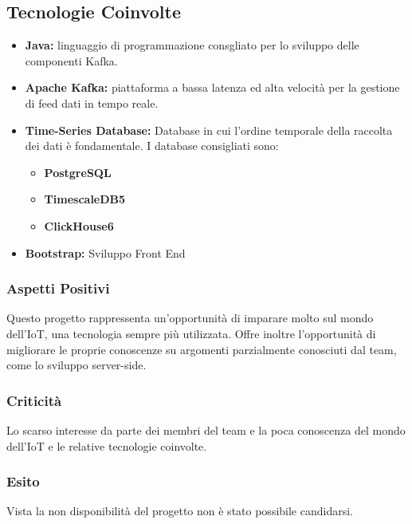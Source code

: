 	\subsection{Tecnologie Coinvolte}
	\begin{itemize}
		\item \textbf{Java:} linguaggio di programmazione consgliato per lo sviluppo delle componenti Kafka.
		\item \textbf{Apache Kafka:} piattaforma a bassa latenza ed alta velocità per la gestione di feed dati in tempo reale.
		\item \textbf{Time-Series Database:} Database in cui l'ordine temporale della raccolta dei dati è fondamentale. I database consigliati sono:
			\begin{itemize}
			\item \textbf{PostgreSQL}
			\item \textbf{TimescaleDB5}
			\item \textbf{ClickHouse6}
			\end{itemize}
		\item \textbf{Bootstrap:} Sviluppo Front End
	\end{itemize}
	\subsubsection{Aspetti Positivi}
	Questo progetto rappressenta un'opportunità di imparare molto sul mondo dell'IoT, una tecnologia sempre più utilizzata. Offre inoltre l'opportunità di migliorare le proprie conoscenze su argomenti parzialmente conosciuti dal team, come lo sviluppo server-side.
	\subsubsection{Criticità}
	Lo scarso interesse da parte dei membri del team e la poca conoscenza del mondo dell'IoT e le relative tecnologie coinvolte.
	\subsubsection{Esito}
	Vista la non disponibilità del progetto non è stato possibile candidarsi.
		
		